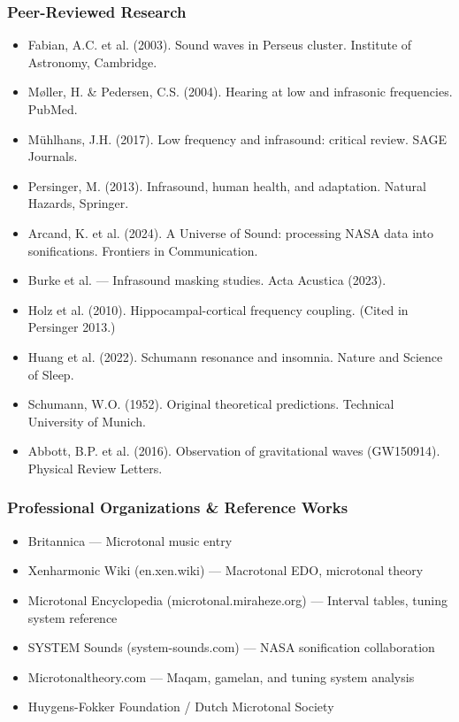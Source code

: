 \documentclass[11pt,letterpaper]{article}
\begin{document}
\subsubsection{Peer-Reviewed Research}
\begin{itemize}[leftmargin=2em]
\item Fabian, A.C. et al. (2003). Sound waves in Perseus cluster. Institute of Astronomy, Cambridge.
\item Møller, H. \& Pedersen, C.S. (2004). Hearing at low and infrasonic frequencies. PubMed.
\item M\"{u}hlhans, J.H. (2017). Low frequency and infrasound: critical review. SAGE Journals.
\item Persinger, M. (2013). Infrasound, human health, and adaptation. Natural Hazards, Springer.
\item Arcand, K. et al. (2024). A Universe of Sound: processing NASA data into sonifications. Frontiers in Communication.
\item Burke et al. --- Infrasound masking studies. Acta Acustica (2023).
\item Holz et al. (2010). Hippocampal-cortical frequency coupling. (Cited in Persinger 2013.)
\item Huang et al. (2022). Schumann resonance and insomnia. Nature and Science of Sleep.
\item Schumann, W.O. (1952). Original theoretical predictions. Technical University of Munich.
\item Abbott, B.P. et al. (2016). Observation of gravitational waves (GW150914). Physical Review Letters.
\end{itemize}

\subsubsection{Professional Organizations \& Reference Works}
\begin{itemize}[leftmargin=2em]
\item Britannica --- Microtonal music entry
\item Xenharmonic Wiki (en.xen.wiki) --- Macrotonal EDO, microtonal theory
\item Microtonal Encyclopedia (microtonal.miraheze.org) --- Interval tables, tuning system reference
\item SYSTEM Sounds (system-sounds.com) --- NASA sonification collaboration
\item Microtonaltheory.com --- Maqam, gamelan, and tuning system analysis
\item Huygens-Fokker Foundation / Dutch Microtonal Society
\end{itemize}
\end{document}
